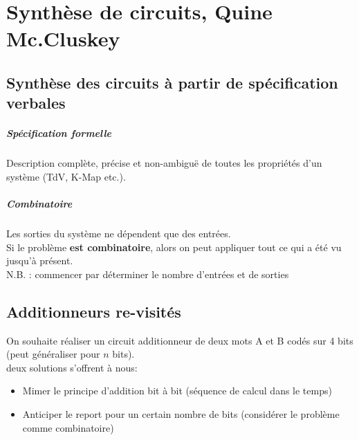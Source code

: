 \chapter{Synthèse de circuits, Quine Mc.Cluskey}
\section{Synthèse des circuits à partir de spécification verbales}
\paragraph{Spécification formelle} Description complète, précise et non-ambiguë de toutes les propriétés d'un système (TdV, K-Map etc.).
\paragraph{Combinatoire} Les sorties du système ne dépendent que des entrées.\\

Si le problème \textbf{est combinatoire}, alors on peut appliquer tout ce qui a été vu jusqu'à présent.\\
N.B. : commencer par déterminer le nombre d'entrées et de sorties
\section{Additionneurs re-visités}
On souhaite réaliser un circuit additionneur de deux mots A et B codés sur 4 bits (peut généraliser pour $n$ bits).\\
deux solutions s'offrent à nous:
\begin{itemize}
	\item Mimer le principe d'addition bit à bit (séquence de calcul dans le temps)
	\item Anticiper le report pour un certain nombre de bits (considérer le problème comme combinatoire)
\end{itemize}
